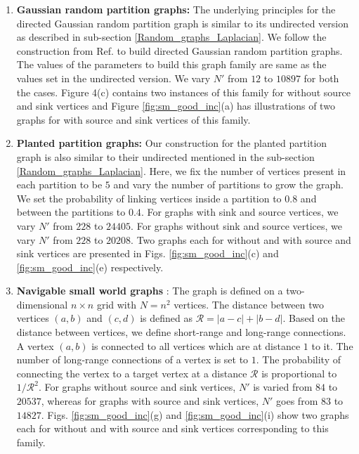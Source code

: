 \documentclass[%
 reprint,
 superscriptaddress,
 amsmath,amssymb,
 aps,
 pra,
floatfix,
nofootinbib,
]{revtex4-2}
\theoremstyle{definition}
\theoremstyle{remark}
\begin{document}
\begin{appendix}
\begin{enumerate}
    \item 
    \textbf{Gaussian random partition graphs:} The underlying principles for the directed Gaussian random partition graph is similar to its undirected version as described in sub-section \ref{Random_graphs_Laplacian}. We follow the construction from Ref. \cite{networkx} to build directed Gaussian random partition graphs. The values of the parameters to build this graph family are same as the values set in the undirected version. We vary $N'$ from $12$ to $10897$ for both the cases. Figure 4(c) contains two instances of this family for without source and sink vertices and Figure \ref{fig:sm_good_inc}(a) has illustrations of two graphs for with source and sink vertices of this family. 
    
    \item 
    \textbf{Planted partition graphs:} 
    Our construction for the planted partition graph is also similar to their undirected mentioned in the sub-section \ref{Random_graphs_Laplacian}. Here, we fix the number of vertices present in each partition to be $5$ and vary the number of partitions to grow the graph. We set the probability of linking vertices inside a partition to $0.8$ and between the partitions to $0.4$. For graphs with sink and source vertices, we vary $N'$ from $228$ to $24405$. For graphs without sink and source vertices, we vary $N'$ from $228$ to $20208$. Two graphs each for without and with source and sink vertices are presented in Figs. \ref{fig:sm_good_inc}(c) and \ref{fig:sm_good_inc}(e) respectively.
    
    \item  
    \textbf{Navigable small world graphs} 
    \cite{kleinberg2000small}: The graph is defined on a two-dimensional $n \times n$ grid with $N = n^2$ vertices. The distance between two vertices $(a, b)$ and $(c, d)$ is defined as $\mathcal{R} = |a-c| +|b-d|$. Based on the distance between vertices, we define short-range and long-range connections. A vertex $(a, b)$ is connected to all vertices which are at distance $1$ to it. The number of long-range connections of a vertex is set to $1$. The probability of connecting the vertex to a target vertex at a distance $\mathcal{R}$ is proportional to $1/\mathcal{R}^2$. For graphs without source and sink vertices, $N'$ is varied from $84$ to $20537$, whereas for graphs with source and sink vertices, $N'$ goes from $83$ to $14827$. Figs. \ref{fig:sm_good_inc}(g) and \ref{fig:sm_good_inc}(i) show two graphs each for without and with source and sink vertices corresponding to this family. 


\end{enumerate}
\end{appendix}
\end{document}
